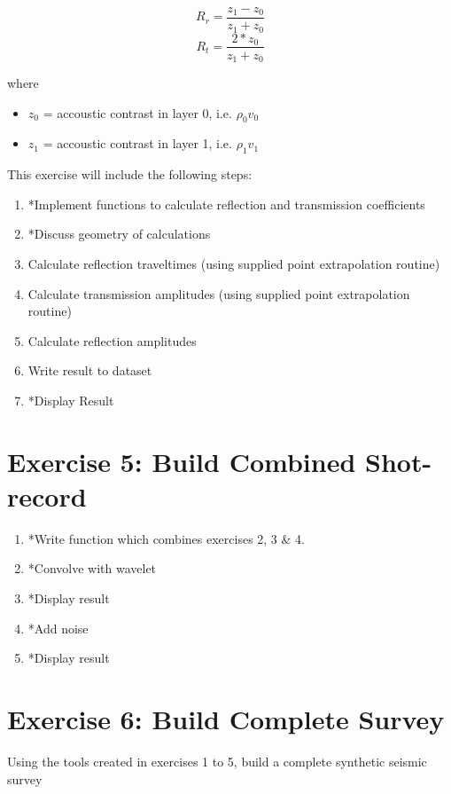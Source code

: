 \documentclass[a4paper, 10pt]{article}
\begin{document}
\[ R_r = \frac{z_1 - z_0}{z_1+z_0}\]
\[ R_t = \frac{2*z_0}{z_1+z_0}\]

where 
\begin{itemize}
\item $z_0$  = accoustic contrast in layer 0, i.e. $\rho_0 v_0$
\item $z_1$ = accoustic contrast in layer 1, i.e. $\rho_1 v_1$
\end{itemize}

This exercise will include the following steps:


\begin{enumerate}
\item *Implement functions to calculate reflection and transmission coefficients
\item *Discuss geometry of calculations
\item Calculate reflection traveltimes (using supplied point extrapolation routine)
\item Calculate transmission amplitudes (using supplied point extrapolation routine)
\item Calculate reflection amplitudes
\item Write result to dataset
\item *Display Result
\end{enumerate}


\section*{Exercise 5: Build Combined Shot-record}

\begin{enumerate}
\item *Write function which combines exercises 2, 3 \& 4.
\item *Convolve with wavelet
\item *Display result
\item *Add noise
\item *Display result
\end{enumerate}
\section*{Exercise 6: Build Complete Survey}

Using the tools created in exercises 1 to 5, build a complete synthetic seismic survey
\end{document}
